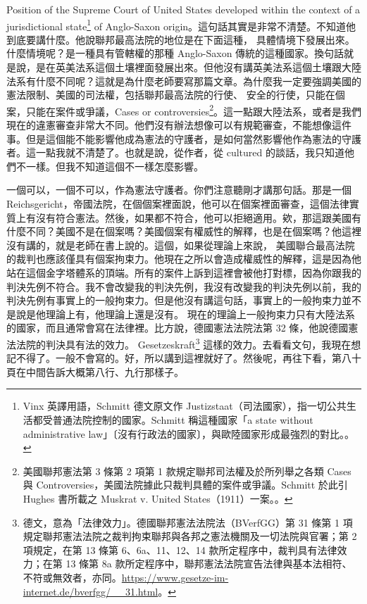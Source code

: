 \hypertarget{w05:cue:272}{}Position of the Supreme Court of United States developed within the context of a jurisdictional state\footnote{Vinx 英譯用語，Schmitt 德文原文作 Justizstaat（司法國家），指一切公共生活都受普通法院控制的國家。Schmitt 稱這種國家「a state without administrative law」〔沒有行政法的國家〕，與歐陸國家形成最強烈的對比。\cite[80, 82]{schmitt2015}。} of Anglo-Saxon origin。這句話其實是非常不清楚。不知道他到底要講什麼。他說聯邦最高法院的地位是在下面這種，
\hypertarget{w05:cue:273}{}具體情境下發展出來。什麼情境呢？是一種具有管轄權的那種 Anglo-Saxon 傳統的這種國家。換句話就是說，是在英美法系這個土壤裡面發展出來。但他沒有講英美法系這個土壤跟大陸法系有什麼不同呢？這就是為什麼老師要寫那篇文章。為什麼我一定要強調美國的憲法限制、美國的司法權，包括聯邦最高法院的行使、
\hypertarget{w05:cue:274}{}安全的行使，只能在個案，只能在案件或爭議，Cases or controversies\footnote{美國聯邦憲法第 3 條第 2 項第 1 款規定聯邦司法權及於所列舉之各類 Cases 與 Controversies，美國法院據此只裁判具體的案件或爭議。Schmitt 於此引 Hughes 書所載之 Muskrat v. United States（1911）一案。\cite[80]{schmitt2015}。}。這一點跟大陸法系，或者是我們現在的違憲審查非常大不同。他們沒有辦法想像可以有規範審查，不能想像這件事。但是這個能不能影響他成為憲法的守護者，是如何當然影響他作為憲法的守護者。這一點我就不清楚了。也就是說，從作者，從 cultured 的談話，我只知道他們不一樣。但我不知道這個不一樣怎麼影響。

\hypertarget{w05:cue:275}{}一個可以，一個不可以，作為憲法守護者。你們注意聽剛才講那句話。那是一個 Reichsgericht，帝國法院，在個個案裡面說，他可以在個案裡面審查，這個法律實質上有沒有符合憲法。然後，如果都不符合，他可以拒絕適用。欸，那這跟美國有什麼不同？美國不是在個案嗎？美國個案有權威性的解釋，也是在個案嗎？他這裡沒有講的，就是老師在書上說的。這個，如果從理論上來說，
\hypertarget{w05:cue:276}{}美國聯合最高法院的裁判也應該僅具有個案拘束力。他現在之所以會造成權威性的解釋，這是因為他站在這個金字塔體系的頂端。所有的案件上訴到這裡會被他打對標，因為你跟我的判決先例不符合。我不會改變我的判決先例，我沒有改變我的判決先例以前，我的判決先例有事實上的一般拘束力。但是他沒有講這句話，事實上的一般拘束力並不是說是他理論上有，他理論上還是沒有。
\hypertarget{w05:cue:277}{}現在的理論上一般拘束力只有大陸法系的國家，而且通常會寫在法律裡。比方說，德國憲法法院法第 32 條，他說德國憲法法院的判決具有法的效力。
\hypertarget{w05:cue:278}{}Gesetzeskraft\footnote{德文，意為「法律效力」。德國聯邦憲法法院法（BVerfGG）第 31 條第 1 項規定聯邦憲法法院之裁判拘束聯邦與各邦之憲法機關及一切法院與官署；第 2 項規定，在第 13 條第 6、6a、11、12、14 款所定程序中，裁判具有法律效力；在第 13 條第 8a 款所定程序中，聯邦憲法法院宣告法律與基本法相符、不符或無效者，亦同。\url{https://www.gesetze-im-internet.de/bverfgg/__31.html}。} 這樣的效力。去看看文句，我現在想記不得了。一般不會寫的。好，所以講到這裡就好了。然後呢，再往下看，第八十頁在中間告訴大概第八行、九行那樣子。

